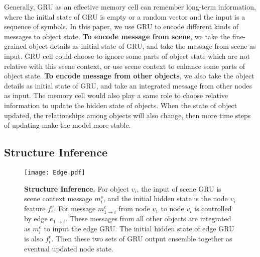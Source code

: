 \documentclass[10pt,twocolumn,letterpaper]{article}
\begin{document}
{Generally, GRU as an effective memory cell can remember long-term information, where the initial state of GRU is empty or a random vector and the input is a sequence of symbols. In this paper, we use GRU to encode different kinds of messages to object state. {\bf To encode message from scene}, we take the fine-grained object details as initial state of GRU, and take the message from scene as input. GRU cell could choose to ignore some parts of object state which are not relative with this scene context, or use scene context to enhance some parts of object state. {\bf To encode message from other objects}, we also take the object details as initial state of GRU, and take an integrated message from other nodes as input. The memory cell would also play a same role to choose relative information to update the hidden state of objects. When the state of object updated, the relationships among objects will also change, then more time steps of updating make the model more stable.}

\subsection{Structure Inference} \label{sec:SI}
\begin{figure}[t]
\begin{center}
   \texttt{[image: Edge.pdf]}
\end{center}
\vspace{-2ex}
   \caption{{\bf Structure Inference.} For object $v_i$, the input of scene GRU is scene context message $m^s_i$, and the initial hidden state is the node $v_i$ feature $f^v_i$. For message $m^e_{1\to i}$ from node $v_1$ to node $v_i$ is controlled by edge $e_{1\to i}$. These messages from all other objects are integrated as $m^e_i$ to input the edge GRU. The initial hidden state of edge GRU is also $f^v_i$. Then these two sets of GRU output ensemble together as eventual updated node state.}
\label{fig:SI}
\vspace{-2ex}
\end{figure}

\end{document}
